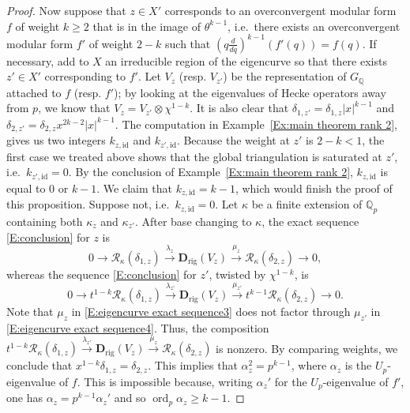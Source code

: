 \documentclass[12pt]{article}
\theoremstyle{definition}
\numberwithin{equation}{theorem}
\newcommand{\calR}{\mathcal{R}}
\newcommand{\QQ}{\mathbb{Q}}
\newcommand{\bbD}{\mathbf{D}}
\def\Qp{\QQ_p}
\newcommand{\rig}{\mathrm{rig}}
\DeclareMathOperator{\ord}{ord}
\begin{document}
\begin{proof}
Now suppose that $z \in X'$ corresponds to an overconvergent modular
form $f$ of weight $k \geq 2$ that is in the image of $\theta^{k-1}$,
i.e.\ there exists an overconvergent modular form $f'$ of weight $2-k$
such that $(q\frac d{dq})^{k-1}(f'(q)) =f(q)$.  If necessary, add to
$X$ an irreducible region of the eigencurve so that there exists $z'
\in X'$ corresponding to $f'$.  Let $V_z$ (resp. $V_{z'}$) be the
representation of $G_\QQ$ attached to $f$ (resp. $f'$); by looking at
the eigenvalues of Hecke operators away from $p$, we know that $V_z =
V_{z'} \otimes \chi^{1-k}$.  It is also clear that $\delta_{1,z'} =
\delta_{1,z} |x|^{k-1}$ and $\delta_{2,z'} = \delta_{2,z}
x^{2k-2}|x|^{k-1}$.  The computation in Example~\ref{Ex:main theorem
  rank 2}, gives us two integers $k_{z,\mathrm{id}}$ and
$k_{z',\mathrm{id}}$.  Because the weight at $z'$ is $2-k < 1$, the
first case we treated above shows that the global triangulation is
saturated at $z'$, i.e.\ $k_{z',\mathrm{id}} = 0$.  By the conclusion
of Example~\ref{Ex:main theorem rank 2}, $k_{z,\mathrm{id}}$ is equal
to $0$ or $k-1$.  We claim that $k_{z,\mathrm{id}} = k-1$, which would
finish the proof of this proposition.  Suppose not,
i.e.\ $k_{z,\mathrm{id}}=0$.  Let $\kappa$ be a finite extension of
$\Qp$ containing both $\kappa_z$ and $\kappa_{z'}$.  After base
changing to $\kappa$, the exact sequence \eqref{E:conclusion} for $z$
is
\begin{equation}
\label{E:eigencurve exact sequence3}
0 \to \calR_\kappa(\delta_{1,z}) \xrightarrow{\lambda_z} \bbD_\rig(V_z) \xrightarrow{\mu_z} \calR_{\kappa}(\delta_{2,z})  \to 0,
\end{equation}
whereas the sequence \eqref{E:conclusion} for $z'$, twisted by
$\chi^{1-k}$, is
\begin{equation}
\label{E:eigencurve exact sequence4}
0 \to t^{1-k} \calR_\kappa(\delta_{1,z}) \xrightarrow{\lambda_{z'}} \bbD_\rig(V_z) \xrightarrow{\mu_{z'}} t^{k-1} \calR_\kappa(\delta_{2,z}) \to 0.
\end{equation}
Note that $\mu_z$ in \eqref{E:eigencurve exact sequence3} does not
factor through $\mu_{z'}$ in \eqref{E:eigencurve exact sequence4}.
Thus, the composition $t^{1-k} \calR_\kappa(\delta_{1,z})
\xrightarrow{\lambda_{z'}} \bbD_\rig(V_z) \xrightarrow{\mu_z}
\calR_\kappa(\delta_{2,z})$ is nonzero.  By comparing weights, we
conclude that $x^{1-k} \delta_{1,z} = \delta_{2,z}$.  This implies
that $\alpha_z^2 = p^{k-1}$, where $\alpha_z$ is the $U_p$-eigenvalue
of $f$.  This is impossible because, writing $\alpha_z'$ for the
$U_p$-eigenvalue of $f'$, one has $\alpha_z = p^{k-1}\alpha_z'$ and so
$\ord_p \alpha_z \geq k-1$.
\end{proof}
\end{document}
